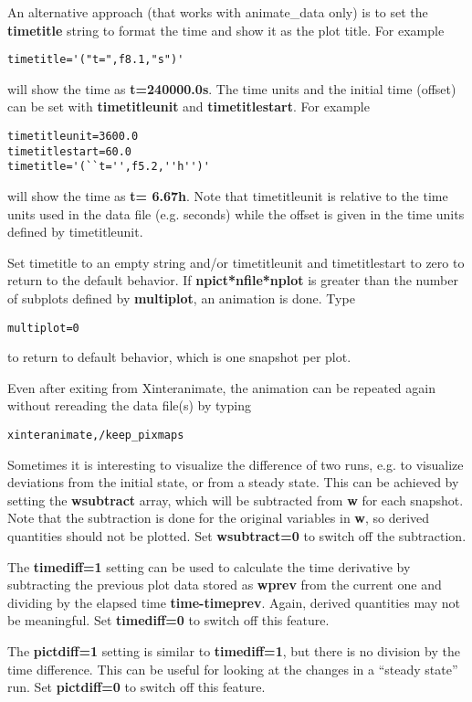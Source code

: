\documentclass{article}
\begin{document}
An alternative approach (that works with animate\_data only) is to set the 
{\bf timetitle} string to format the time and show it as the plot title.
For example
\begin{verbatim}
timetitle='("t=",f8.1,"s")'
\end{verbatim}
will show the time as {\bf t=240000.0s}. The time units and the
initial time (offset) can be set with {\bf timetitleunit} 
and {\bf timetitlestart}. For example
\begin{verbatim}
timetitleunit=3600.0
timetitlestart=60.0
timetitle='(``t='',f5.2,''h'')'
\end{verbatim}
will show the time as {\bf t= 6.67h}. Note that timetitleunit is
relative to the time units used in the data file (e.g. seconds)
while the offset is given in the time units defined by timetitleunit.

Set timetitle to an empty string and/or timetitleunit and timetitlestart
to zero to return to the default behavior. 
If {\bf npict*nfile*nplot} is greater than the number 
of subplots defined by {\bf multiplot}, an animation is done. 
Type 
\begin{verbatim}
multiplot=0
\end{verbatim}
to return to default behavior, which is one snapshot per plot.

Even after exiting from Xinteranimate, the animation can be repeated
again without rereading the data file(s) by typing
\begin{verbatim}
xinteranimate,/keep_pixmaps
\end{verbatim}
Sometimes it is interesting to visualize the difference of two runs, e.g.
to visualize deviations from the initial state, or from a steady state.
This can be achieved by setting the {\bf wsubtract} array, which will be 
subtracted from {\bf w} for each snapshot. Note that the subtraction is
done for the original variables in {\bf w}, 
so derived quantities should not be plotted. 
Set {\bf wsubtract=0} to switch off the subtraction.

The {\bf timediff=1} setting can be used to calculate the time
derivative by subtracting the previous plot data stored as {\bf wprev}
from the current one and dividing by the elapsed time {\bf time-timeprev}. 
Again, derived quantities may not be meaningful.
Set {\bf timediff=0} to switch off this feature.

The {\bf pictdiff=1} setting is similar to {\bf timediff=1}, but there is
no division by the time difference. This can be useful for looking at
the changes in a ``steady state'' run. Set {\bf pictdiff=0} to switch off this
feature.
\end{document}
